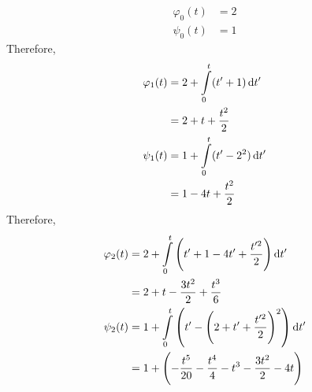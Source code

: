 \documentclass[fleqn, a4paper, 12pt, oneside]{amsart}
\theoremstyle{definition}
\theoremstyle{theorem}
\begin{document}
\begin{solution}
	\begin{align*}
		\varphi_0(t) & = 2 \\
		\psi_0(t)    & = 1
	\end{align*}
	Therefore,
	\begin{align*}
		\varphi_1(t) & = 2 + \int\limits_{0}^{t} (t' + 1) \dif t'   \\
                             & = 2 + t + \dfrac{t^2}{2}                     \\
		\psi_1(t)    & = 1 + \int\limits_{0}^{t} (t' - 2^2) \dif t' \\
                             & = 1 - 4 t + \frac{t^2}{2}
	\end{align*}
	Therefore,
	\begin{align*}
		\varphi_2(t) & = 2 + \int\limits_{0}^{t} \left( t' + 1 - 4 t' + \frac{t'^2}{2} \right) \dif t'                \\
                             & = 2 + t - \frac{3 t^2}{2} + \frac{t^3}{6}                                                      \\
		\psi_2(t)    & = 1 + \int\limits_{0}^{t} \left( t' - \left( 2 + t' + \frac{t'^2}{2} \right)^2 \right) \dif t' \\
                             & = 1 + \left( -\frac{t^5}{20} - \frac{t^4}{4} - t^3 - \frac{3 t^2}{2} - 4 t \right)             \\
	\end{align*}
\end{solution}
\end{document}
